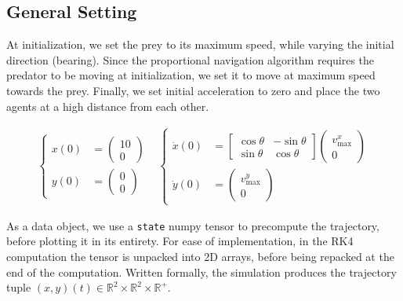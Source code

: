 \documentclass[11pt, twocolumn]{article}
\begin{document}
\subsection{General Setting}
At initialization, we set the prey to its maximum speed, while varying the initial direction (bearing). Since the proportional navigation algorithm requires the predator to be moving at initialization, we set it to move at maximum speed towards the prey. Finally, we set initial acceleration to zero and place the two agents at a high distance from each other.

\[
  \begin{array}{l}
    \left\{
      \begin{aligned}
        x(0) &=
        \begin{pmatrix} 10 \\ 0
        \end{pmatrix} \\
        y(0) &=
        \begin{pmatrix} 0 \\ 0
        \end{pmatrix}
      \end{aligned}
      \right.
    \end{array}
    \begin{array}{l}
      \left\{
        \begin{aligned}
          \dot{x}(0) &=
          \begin{bmatrix}
            \cos\theta & -\sin\theta \\
            \sin\theta & \cos\theta
          \end{bmatrix}
          \begin{pmatrix}
            v^x_{\text{max}} \\
            0
          \end{pmatrix} \\
          \dot{y}(0) &=
          \begin{pmatrix} v^y_{\text{max}} \\ 0
          \end{pmatrix}
        \end{aligned}
        \right.
      \end{array}
    \]

    As a data object, we use a \texttt{state} numpy tensor to precompute the trajectory, before plotting it in its entirety. For ease of implementation, in the RK4 computation the tensor is unpacked into 2D arrays, before being repacked at the end of the computation. Written formally, the simulation produces the trajectory tuple $(x,y)(t)\in \mathbb{R}^2 \times \mathbb{R}^2 \times \mathbb{R}^+$.
\end{document}
